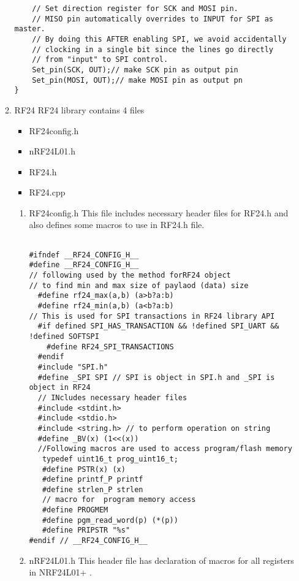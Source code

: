 \documentclass{article}
\begin{document}
\begin{itemize}
\begin{enumerate}
\begin{lstlisting}
    // Set direction register for SCK and MOSI pin.
    // MISO pin automatically overrides to INPUT for SPI as master.
    // By doing this AFTER enabling SPI, we avoid accidentally
    // clocking in a single bit since the lines go directly
    // from "input" to SPI control.
    Set_pin(SCK, OUT);// make SCK pin as output pin
    Set_pin(MOSI, OUT);// make MOSI pin as output pn
}
\end{lstlisting}
\item RF24
\newline RF24 library contains 4 files
\begin{itemize}
\item RF24config.h
\item nRF24L01.h
\item RF24.h
\item RF24.cpp
\end{itemize}
\begin{enumerate}
\item RF24config.h
\newline This file includes necessary header files for RF24.h and also defines some macros to use in RF24.h file.

\begin{lstlisting}

#ifndef __RF24_CONFIG_H__
#define __RF24_CONFIG_H__
// following used by the method forRF24 object 
// to find min and max size of paylaod (data) size 
  #define rf24_max(a,b) (a>b?a:b)
  #define rf24_min(a,b) (a<b?a:b)
// This is used for SPI transactions in RF24 library API
  #if defined SPI_HAS_TRANSACTION && !defined SPI_UART && !defined SOFTSPI
    #define RF24_SPI_TRANSACTIONS
  #endif
  #include "SPI.h"
  #define _SPI SPI // SPI is object in SPI.h and _SPI is object in RF24
  // INcludes necessary header files
  #include <stdint.h>
  #include <stdio.h>
  #include <string.h> // to perform operation on string
  #define _BV(x) (1<<(x)) 
  //Following macros are used to access program/flash memory
   typedef uint16_t prog_uint16_t;
   #define PSTR(x) (x)
   #define printf_P printf
   #define strlen_P strlen
   // macro for  program memory access
   #define PROGMEM
   #define pgm_read_word(p) (*(p))
   #define PRIPSTR "%s"
#endif // __RF24_CONFIG_H__

\end{lstlisting}
\item nRF24L01.h
\newline This header file has declaration of macros for all registers in NRF24L01+ .
\begin{lstlisting}


\end{lstlisting}
\end{enumerate}
\end{enumerate}
\end{itemize}
\end{document}
